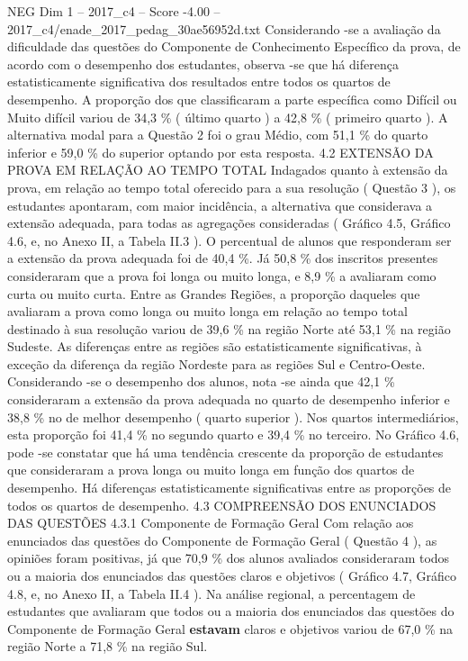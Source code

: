 \begin{textsample}{NEG Dim 1 – 2017\_c4 – Score -4.00 – 2017\_c4/enade\_2017\_pedag\_30ae56952d.txt}
Considerando -se a avaliação da dificuldade das questões do Componente de Conhecimento Específico da prova, de acordo com o desempenho dos estudantes, observa -se que há diferença estatisticamente significativa dos resultados entre todos os quartos de desempenho.
A proporção dos que classificaram a parte específica como Difícil ou Muito difícil variou de 34,3 \% ( último quarto ) a 42,8 \% ( primeiro quarto ).
A alternativa modal para a Questão 2 foi o grau Médio, com 51,1 \% do quarto inferior e 59,0 \% do superior optando por esta resposta. 4.2 EXTENSÃO DA PROVA EM RELAÇÃO AO TEMPO TOTAL Indagados quanto à extensão da prova, em relação ao tempo total oferecido para a sua resolução ( Questão 3 ), os estudantes apontaram, com maior incidência, a alternativa que considerava a extensão adequada, para todas as agregações consideradas ( Gráfico 4.5, Gráfico 4.6, e, no Anexo II, a Tabela II.3 ).
O percentual de alunos que responderam ser a extensão da prova adequada foi de 40,4 \%.
Já 50,8 \% dos inscritos presentes consideraram que a prova foi longa ou muito longa, e 8,9 \% a avaliaram como curta ou muito curta.
Entre as Grandes Regiões, a proporção daqueles que avaliaram a prova como longa ou muito longa em relação ao tempo total destinado à sua resolução variou de 39,6 \% na região Norte até 53,1 \% na região Sudeste.
As diferenças entre as regiões são estatisticamente significativas, à exceção da diferença da região Nordeste para as regiões Sul e Centro-Oeste.
Considerando -se o desempenho dos alunos, nota -se ainda que 42,1 \% consideraram a extensão da prova adequada no quarto de desempenho inferior e 38,8 \% no de melhor desempenho ( quarto superior ).
Nos quartos intermediários, esta proporção foi 41,4 \% no segundo quarto e 39,4 \% no terceiro.
No Gráfico 4.6, pode -se constatar que há uma tendência crescente da proporção de estudantes que consideraram a prova longa ou muito longa em função dos quartos de desempenho.
Há diferenças estatisticamente significativas entre as proporções de todos os quartos de desempenho. 4.3 COMPREENSÃO DOS ENUNCIADOS DAS QUESTÕES 4.3.1 Componente de Formação Geral Com relação aos enunciados das questões do Componente de Formação Geral ( Questão 4 ), as opiniões foram positivas, já que 70,9 \% dos alunos avaliados consideraram todos ou a maioria dos enunciados das questões claros e objetivos ( Gráfico 4.7, Gráfico 4.8, e, no Anexo II, a Tabela II.4 ).
Na análise regional, a percentagem de estudantes que avaliaram que todos ou a maioria dos enunciados das questões do Componente de Formação Geral \textbf{estavam} claros e objetivos variou de 67,0 \% na região Norte a 71,8 \% na região Sul.

\end{textsample}
